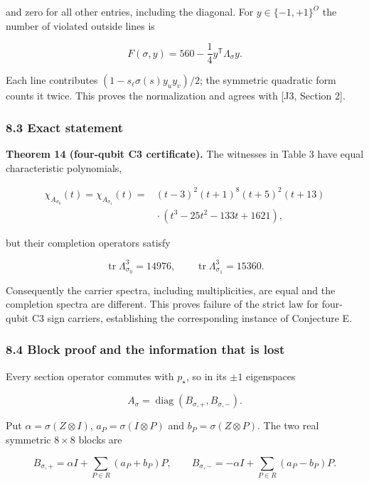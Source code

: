 \documentclass[11pt,a4paper]{article}
\begin{document}
and zero for all other entries, including the diagonal. For \(y\in\{-1,+1\}^O\) the number of
violated outside lines is

\[F(\sigma,y)=560-\frac14y^{\mathsf T}\Lambda_\sigma y.
\tag{C1}\]

Each line contributes \((1-s_\ell\sigma(s)y_uy_v)/2\); the symmetric quadratic form counts it twice.
This proves the normalization and agrees with {[}J3, Section 2{]}.

\subsubsection{8.3 Exact statement}\label{83-exact-statement}

\textbf{Theorem 14 (four-qubit C3 certificate).} The witnesses in Table 3 have equal characteristic
polynomials,

\[\begin{aligned}
\chi_{A_{\sigma_0}}(t)=\chi_{A_{\sigma_1}}(t)
={}&(t-3)^2(t+1)^8(t+5)^2(t+13)\\ &{}\cdot(t^3-25t^2-133t+1621),
\end{aligned}
\tag{C2}\]

but their completion operators satisfy

\[\operatorname{tr}\Lambda_{\sigma_0}^3=14976,\qquad
\operatorname{tr}\Lambda_{\sigma_1}^3=15360.
\tag{C3}\]

Consequently the carrier spectra, including multiplicities, are equal and the completion spectra
are different. This proves failure of the strict law for four-qubit C3 sign carriers, establishing
the corresponding instance of Conjecture E.

\subsubsection{8.4 Block proof and the information that is lost}\label{84-block-proof-and-the-information-that-is-lost}

Every section operator commutes with \(p_\star\), so in its \(\pm1\) eigenspaces

\[A_\sigma=\operatorname{diag}(B_{\sigma,+},B_{\sigma,-}).\]

Put \(\alpha=\sigma(Z\otimes I)\), \(a_P=\sigma(I\otimes P)\) and \(b_P=\sigma(Z\otimes P)\). The
two real symmetric \(8\times8\) blocks are

\[B_{\sigma,+}=\alpha I+\sum_{P\in R}(a_P+b_P)P,\qquad
B_{\sigma,-}=-\alpha I+\sum_{P\in R}(a_P-b_P)P.
\tag{C4}\]
\end{document}
